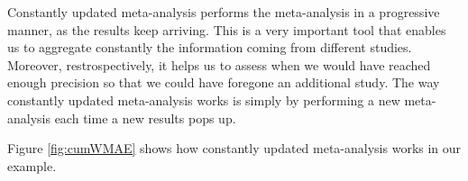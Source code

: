 \documentclass[]{book}
\newenvironment{Shaded}{\begin{snugshade}}{\end{snugshade}}
\newcommand{\ControlFlowTok}[1]{\textcolor[rgb]{0.13,0.29,0.53}{\textbf{#1}}}
\newcommand{\DataTypeTok}[1]{\textcolor[rgb]{0.13,0.29,0.53}{#1}}
\newcommand{\DecValTok}[1]{\textcolor[rgb]{0.00,0.00,0.81}{#1}}
\newcommand{\FloatTok}[1]{\textcolor[rgb]{0.00,0.00,0.81}{#1}}
\newcommand{\KeywordTok}[1]{\textcolor[rgb]{0.13,0.29,0.53}{\textbf{#1}}}
\newcommand{\NormalTok}[1]{#1}
\newcommand{\OperatorTok}[1]{\textcolor[rgb]{0.81,0.36,0.00}{\textbf{#1}}}
\newcommand{\StringTok}[1]{\textcolor[rgb]{0.31,0.60,0.02}{#1}}
\theoremstyle{definition}
\theoremstyle{definition}
\theoremstyle{definition}
\theoremstyle{remark}
\let\BeginKnitrBlock\begin \let\EndKnitrBlock\end
\begin{document}
Constantly updated meta-analysis performs the meta-analysis in a progressive manner, as the results keep arriving.
This is a very important tool that enables us to aggregate constantly the information coming from different studies.
Moreover, restrospectively, it helps us to assess when we would have reached enough precision so that we could have foregone an additional study.
The way constantly updated meta-analysis works is simply by performing a new meta-analysis each time a new results pops up.

\BeginKnitrBlock{example}
\protect\hypertarget{exm:unnamed-chunk-161}{}{\label{exm:unnamed-chunk-161} }Figure \ref{fig:cumWMAE} shows how constantly updated meta-analysis works in our example.
\EndKnitrBlock{example}

\begin{Shaded}
\end{Shaded}
\end{document}
